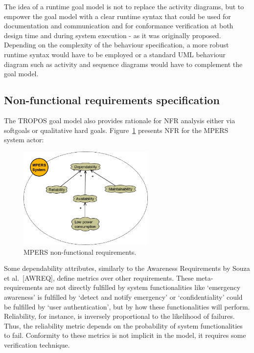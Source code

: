 The idea of a runtime goal model is not to replace the activity diagrams, but to empower the goal model with a clear runtime syntax that could be used for 
documentation and communication and for conformance verification at both design time and during system execution - as it was originally proposed. Depending on the complexity of the behaviour specification, a more robust runtime syntax would have to be employed or a standard UML behaviour diagram such as activity and sequence diagrams would have to complement the goal model.


\subsection{Non-functional requirements specification}

The TROPOS goal model also provides rationale for NFR analysis either via softgoals or qualitative hard goals. Figure~\ref{fig:MPERS_NFR} presents NFR for the MPERS system actor:

\begin{figure}[h!]
\centering
\includegraphics[width=0.6\textwidth]{imgs/MPERS_NFR.png}
\caption{MPERS non-functional requirements.}
\label{fig:MPERS_NFR}
\end{figure}

Some dependability attributes, similarly to the Awareness Requirements by Souza et al.~[AWREQ], define metrics over other requirements. These meta-requirements are not directly fulfilled by system functionalities like `emergency awareness' is fulfilled by `detect and notify emergency' or `confidentiality' could be fulfilled by `user authentication', but by how these functionalities will perform. Reliability, for instance, is inversely proportional to the likelihood of failures. Thus, the reliability metric depends on the probability of system functionalities to fail. Conformity to these metrics is not implicit in the model, it requires some verification technique.

